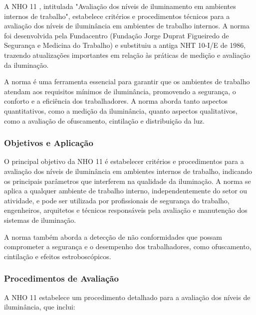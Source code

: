 A \gls{NHO} 11 \cite{NHO11}, intitulada "Avaliação dos níveis de iluminamento em ambientes internos de trabalho", estabelece critérios e procedimentos técnicos para a avaliação dos níveis de iluminância em ambientes de trabalho internos. A norma foi desenvolvida pela Fundacentro (Fundação Jorge Duprat Figueiredo de Segurança e Medicina do Trabalho) e substituiu a antiga NHT 10-I/E de 1986, trazendo atualizações importantes em relação às práticas de medição e avaliação da iluminação.

A norma é uma ferramenta essencial para garantir que os ambientes de trabalho atendam aos requisitos mínimos de iluminância, promovendo a segurança, o conforto e a eficiência dos trabalhadores. A norma aborda tanto aspectos quantitativos, como a medição da iluminância, quanto aspectos qualitativos, como a avaliação de ofuscamento, cintilação e distribuição da luz.

\subsubsection{Objetivos e Aplicação}

O principal objetivo da \gls{NHO} 11 é estabelecer critérios e procedimentos para a avaliação dos níveis de iluminância em ambientes internos de trabalho, indicando os principais parâmetros que interferem na qualidade da iluminação. A norma se aplica a qualquer ambiente de trabalho interno, independentemente do setor ou atividade, e pode ser utilizada por profissionais de segurança do trabalho, engenheiros, arquitetos e técnicos responsáveis pela avaliação e manutenção dos sistemas de iluminação.

A norma também aborda a detecção de não conformidades que possam comprometer a segurança e o desempenho dos trabalhadores, como ofuscamento, cintilação e efeitos estroboscópicos.

\subsubsection{Procedimentos de Avaliação}

A \gls{NHO} 11 estabelece um procedimento detalhado para a avaliação dos níveis de iluminância, que inclui:

